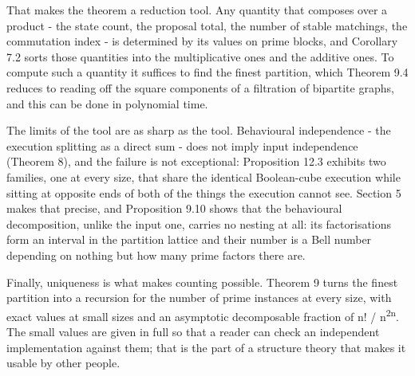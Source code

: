 \documentclass[
  11pt,
]{article}
\begin{document}
That makes the theorem a reduction tool. Any quantity that composes over
a product - the state count, the proposal total, the number of stable
matchings, the commutation index - is determined by its values on prime
blocks, and Corollary 7.2 sorts those quantities into the multiplicative
ones and the additive ones. To compute such a quantity it suffices to
find the finest partition, which Theorem 9.4 reduces to reading off the
square components of a filtration of bipartite graphs, and this can be
done in polynomial time.

The limits of the tool are as sharp as the tool. Behavioural
independence - the execution splitting as a direct sum - does not imply
input independence (Theorem 8), and the failure is not exceptional:
Proposition 12.3 exhibits two families, one at every size, that share
the identical Boolean-cube execution while sitting at opposite ends of
both of the things the execution cannot see. Section 5 makes that
precise, and Proposition 9.10 shows that the behavioural decomposition,
unlike the input one, carries no nesting at all: its factorisations form
an interval in the partition lattice and their number is a Bell number
depending on nothing but how many prime factors there are.

Finally, uniqueness is what makes counting possible. Theorem 9 turns the
finest partition into a recursion for the number of prime instances at
every size, with exact values at small sizes and an asymptotic
decomposable fraction of n! / n\textsuperscript{2n}. The small values
are given in full so that a reader can check an independent
implementation against them; that is the part of a structure theory that
makes it usable by other people.
\end{document}
